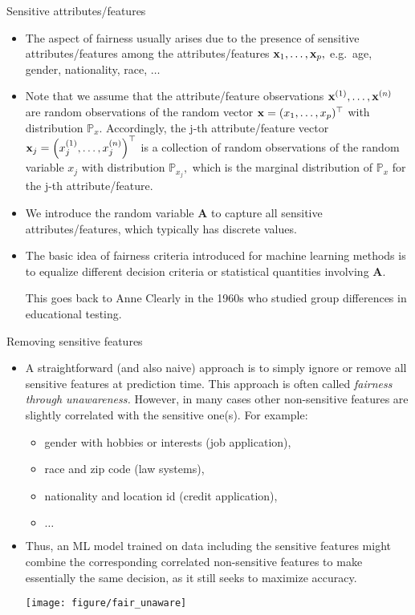 \documentclass[11pt,compress,t,notes=noshow, xcolor=table]{beamer}
\newcommand{\sens}{\mathbf{A}} %
\newcommand{\Px}{\mathbb{P}_{x}} %
\newcommand{\Pxj}{\mathbb{P}_{x_j}} %
\begin{document}
\begin{vbframe}{Sensitive attributes/features}
	\small{
		\begin{itemize}
%			
			\item The aspect of fairness usually arises due to the presence of sensitive attributes/features among the attributes/features  $\mathbf{x}_1, \ldots, \mathbf{x}_p,$ e.g.\ age, gender, nationality, race, $\ldots$
%			
			\item Note that we assume that the attribute/feature observations $\mathbf{x}^{(1)},\ldots,\mathbf{x}^{(n)}$ are random observations of the random vector $\mathbf{x}=(x_1,\ldots,x_p)^\top$ with distribution $\Px.$ Accordingly, the j-th attribute/feature vector $\mathbf{x}_j = \left(x^{(1)}_j, \ldots, x^{(n)}_j\right)^\top$ is a collection of random observations of the random variable $x_j$ with distribution $\Pxj,$ which is the marginal distribution of $\Px$ for the j-th attribute/feature.
%
			\item We introduce the random variable $\sens$ to capture all sensitive attributes/features, which typically has discrete values.
%			
			\item The basic idea of fairness criteria introduced for machine learning methods is to equalize different decision criteria or statistical quantities  involving $\sens$.
%			

			\scriptsize{This goes back to Anne Clearly in the 1960s who studied group differences in educational testing.}
%			
		\end{itemize}
	}
\end{vbframe}


\begin{frame}{Removing sensitive features}
	\small{
		\begin{itemize}
			\item A straightforward (and also naive) approach is to simply ignore or remove all sensitive features at prediction time. This approach is often called \emph{fairness through unawareness.}  However, in many cases other non-sensitive features are slightly correlated with the sensitive one(s). For example:
%			
			\begin{itemize}
				\small
%				
				\item gender with hobbies or interests (job application),
%				
				\item race and zip code (law systems),
%				
				\item nationality and location id (credit application),
%				
				\item $\ldots$
%				
			\end{itemize}
			\item Thus, an ML model trained on data including the sensitive features might combine the corresponding correlated non-sensitive features to make essentially the same decision, as it still seeks to maximize accuracy.
			\begin{center}
				\texttt{[image: figure/fair\_unaware]}
			\end{center}
		\end{itemize}
	}
\end{frame}
\end{document}
